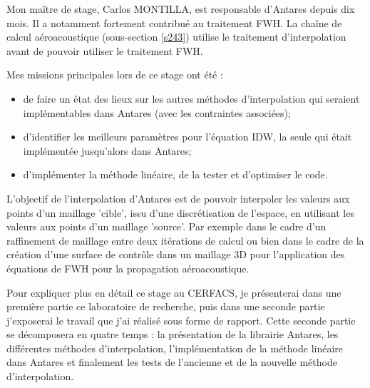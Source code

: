 Mon maître de stage, Carlos MONTILLA, est responsable d'Antares depuis dix mois. Il a notamment fortement contribué au traitement \ac{FWH}. La chaîne de calcul aéroacoustique (sous-section \ref{s243}) utilise le traitement d'interpolation avant de pouvoir utiliser le traitement FWH.

Mes missions principales lors de ce stage ont été :

\begin{itemize}
    \item de faire un état des lieux sur les autres méthodes d'interpolation qui seraient implémentables dans Antares (avec les contraintes associées);
    \item d'identifier les meilleurs paramètres pour l'équation \ac{IDW}, la seule qui était implémentée jusqu'alors dans Antares; %
    \item d'implémenter la méthode linéaire, de la tester et d'optimiser le code.  %
\end{itemize}




L'objectif de l'interpolation d'Antares est de pouvoir interpoler les valeurs aux points d'un maillage 'cible', issu d'une discrétisation de l'espace, en utilisant les valeurs aux points d'un maillage 'source'.
Par exemple dans le cadre d'un raffinement de maillage entre deux itérations de calcul ou bien dans le cadre de la création d'une surface de contrôle dans un maillage 3D pour l'application des équations de FWH pour la propagation aéroacoustique.

Pour expliquer plus en détail ce stage au CERFACS, je présenterai dans une première partie ce laboratoire de recherche, puis dans une seconde partie j'exposerai le travail que j'ai réalisé sous forme de rapport. Cette seconde partie se décomposera en quatre temps : la présentation de la librairie Antares, les différentes méthodes d'interpolation, l'implémentation de la méthode linéaire dans Antares et finalement les tests de l'ancienne et de la nouvelle méthode d'interpolation.